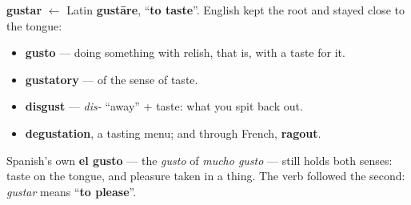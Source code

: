 \begin{cousinweb}
\textbf{gustar} $\leftarrow$ Latin \textbf{gustāre}, \textquotedblleft{}\textbf{to taste}\textquotedblright{}. English kept the root and stayed close to the tongue:

\begin{itemize}
\raggedright
  \item \textbf{gusto} — doing something with relish, that is, with a taste for it.
  \item \textbf{gustatory} — of the sense of taste.
  \item \textbf{disgust} — \emph{dis-} \textquotedblleft{}away\textquotedblright{} + taste: what you spit back out.
  \item \textbf{degustation}, a tasting menu; and through French, \textbf{ragout}.
\end{itemize}

Spanish's own \textbf{el gusto} — the \emph{gusto} of \emph{mucho gusto} — still holds both senses: taste on the tongue, and pleasure taken in a thing. The verb followed the second: \emph{gustar} means \textquotedblleft{}\textbf{to please}\textquotedblright{}.
\end{cousinweb}

